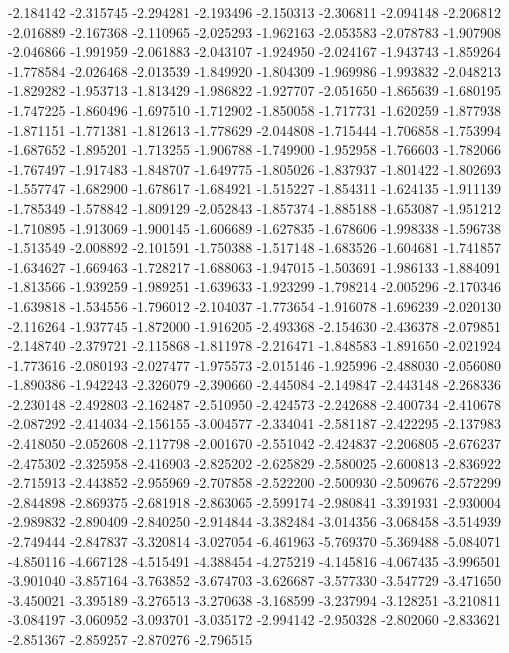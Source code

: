 -2.184142
-2.315745
-2.294281
-2.193496
-2.150313
-2.306811
-2.094148
-2.206812
-2.016889
-2.167368
-2.110965
-2.025293
-1.962163
-2.053583
-2.078783
-1.907908
-2.046866
-1.991959
-2.061883
-2.043107
-1.924950
-2.024167
-1.943743
-1.859264
-1.778584
-2.026468
-2.013539
-1.849920
-1.804309
-1.969986
-1.993832
-2.048213
-1.829282
-1.953713
-1.813429
-1.986822
-1.927707
-2.051650
-1.865639
-1.680195
-1.747225
-1.860496
-1.697510
-1.712902
-1.850058
-1.717731
-1.620259
-1.877938
-1.871151
-1.771381
-1.812613
-1.778629
-2.044808
-1.715444
-1.706858
-1.753994
-1.687652
-1.895201
-1.713255
-1.906788
-1.749900
-1.952958
-1.766603
-1.782066
-1.767497
-1.917483
-1.848707
-1.649775
-1.805026
-1.837937
-1.801422
-1.802693
-1.557747
-1.682900
-1.678617
-1.684921
-1.515227
-1.854311
-1.624135
-1.911139
-1.785349
-1.578842
-1.809129
-2.052843
-1.857374
-1.885188
-1.653087
-1.951212
-1.710895
-1.913069
-1.900145
-1.606689
-1.627835
-1.678606
-1.998338
-1.596738
-1.513549
-2.008892
-2.101591
-1.750388
-1.517148
-1.683526
-1.604681
-1.741857
-1.634627
-1.669463
-1.728217
-1.688063
-1.947015
-1.503691
-1.986133
-1.884091
-1.813566
-1.939259
-1.989251
-1.639633
-1.923299
-1.798214
-2.005296
-2.170346
-1.639818
-1.534556
-1.796012
-2.104037
-1.773654
-1.916078
-1.696239
-2.020130
-2.116264
-1.937745
-1.872000
-1.916205
-2.493368
-2.154630
-2.436378
-2.079851
-2.148740
-2.379721
-2.115868
-1.811978
-2.216471
-1.848583
-1.891650
-2.021924
-1.773616
-2.080193
-2.027477
-1.975573
-2.015146
-1.925996
-2.488030
-2.056080
-1.890386
-1.942243
-2.326079
-2.390660
-2.445084
-2.149847
-2.443148
-2.268336
-2.230148
-2.492803
-2.162487
-2.510950
-2.424573
-2.242688
-2.400734
-2.410678
-2.087292
-2.414034
-2.156155
-3.004577
-2.334041
-2.581187
-2.422295
-2.137983
-2.418050
-2.052608
-2.117798
-2.001670
-2.551042
-2.424837
-2.206805
-2.676237
-2.475302
-2.325958
-2.416903
-2.825202
-2.625829
-2.580025
-2.600813
-2.836922
-2.715913
-2.443852
-2.955969
-2.707858
-2.522200
-2.500930
-2.509676
-2.572299
-2.844898
-2.869375
-2.681918
-2.863065
-2.599174
-2.980841
-3.391931
-2.930004
-2.989832
-2.890409
-2.840250
-2.914844
-3.382484
-3.014356
-3.068458
-3.514939
-2.749444
-2.847837
-3.320814
-3.027054
-6.461963
-5.769370
-5.369488
-5.084071
-4.850116
-4.667128
-4.515491
-4.388454
-4.275219
-4.145816
-4.067435
-3.996501
-3.901040
-3.857164
-3.763852
-3.674703
-3.626687
-3.577330
-3.547729
-3.471650
-3.450021
-3.395189
-3.276513
-3.270638
-3.168599
-3.237994
-3.128251
-3.210811
-3.084197
-3.060952
-3.093701
-3.035172
-2.994142
-2.950328
-2.802060
-2.833621
-2.851367
-2.859257
-2.870276
-2.796515
